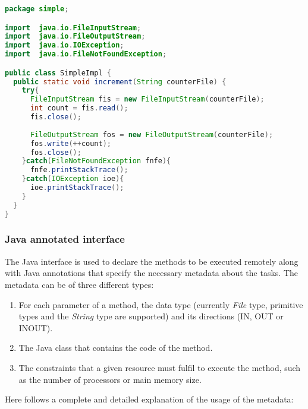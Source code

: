 \begin{lstlisting}[language=java]
package simple;

import  java.io.FileInputStream;
import  java.io.FileOutputStream;
import  java.io.IOException;
import  java.io.FileNotFoundException;

public class SimpleImpl {
  public static void increment(String counterFile) {
    try{
      FileInputStream fis = new FileInputStream(counterFile);
      int count = fis.read();
      fis.close();
      
      FileOutputStream fos = new FileOutputStream(counterFile);
      fos.write(++count);
      fos.close();
    }catch(FileNotFoundException fnfe){
      fnfe.printStackTrace();
    }catch(IOException ioe){
      ioe.printStackTrace();
    }
  }
}
\end{lstlisting}


\subsubsection{Java annotated interface}
The Java interface is used to declare the methods to be executed remotely along with Java annotations that
specify the necessary metadata about the tasks. The metadata can be of three different types:

\begin{enumerate}
 \item For each parameter of a method, the data type (currently {\it File} type, primitive types and the {\it String} type are supported) and its directions (IN, OUT or INOUT).
 \item The Java class that contains the code of the method.
 \item The constraints that a given resource must fulfil to execute the method, such as the number of processors or main memory size.
\end{enumerate}

Here follows a complete and detailed explanation of the usage of the metadata:

